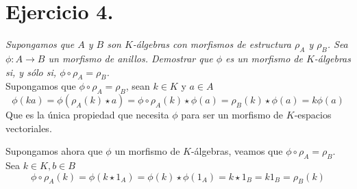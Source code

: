 \section{Ejercicio 4.} \emph{Supongamos que \(A\) y \(B\) son
  \(K\)-álgebras con
morfismos de estructura \(\rho_A\) y \(\rho_B\). Sea \( \phi:A \to B\) un morfismo
de anillos. Demostrar que \(\phi\) es un morfismo de \(K\)-álgebras si, y sólo si,
\(\phi \circ \rho_A = \rho_B\).} \\

Supongamos que \(\phi \circ \rho_A = \rho_B\), sean \(k \in K\) y \(a \in A\)
\[
\phi(ka) = \phi(\rho_A(k)\star a) = \phi \circ \rho_A (k) \star \phi(a) = \rho_B(k)\star \phi(a)  = k \phi(a)
\]
Que es la única propiedad que necesita \(\phi \) para ser un morfismo de \(K\)-espacios vectoriales.

Supongamos ahora que \(\phi \) un morfismo de \(K\)-álgebras, veamos que \(\phi \circ \rho_A = \rho_B\).
Sea \(k \in K, b \in B\)
\[
\phi \circ \rho_A (k) = \phi(k \star 1_A) = \phi(k) \star \phi(1_A) = k \star 1_B = k1_B = \rho_B(k)
\]